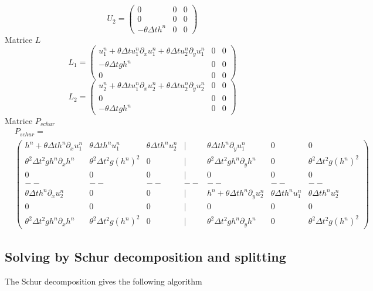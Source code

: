 \documentclass[a4paper, 11pt]{report}
\begin{document}
\begin{equation*}
U_2=\begin{pmatrix}
0&0&0\\
0&0&0\\
-\theta\Delta th^n&0&0
\end{pmatrix}
\end{equation*}
Matrice $L$
\begin{equation*}
L_1=\begin{pmatrix}
u_1^n+\theta\Delta tu_1^n\partial_xu_1^n+\theta\Delta tu_2^n\partial_yu_1^n&0&0\\
-\theta \Delta tgh^n&0&0\\
0&0&0
\end{pmatrix}
\end{equation*}
\begin{equation*}
L_2=\begin{pmatrix}
u_2^n+\theta\Delta tu_1^n\partial_xu_2^n+\theta\Delta tu_2^n\partial_yu_2^n&0&0\\
0&0&0\\
-\theta\Delta tgh^n&0&0
\end{pmatrix}
\end{equation*}
Matrice $P_{schur}$
\begin{equation*}
\begin{split}
&P_{schur}=\\
&\begin{pmatrix}
h^n+\theta\Delta th^n\partial_xu_1^n&\theta\Delta th^nu_1^n&\theta\Delta th^nu_2^n&|&\theta\Delta th^n\partial_yu_1^n&0&0\\
\theta^2\Delta t^2gh^n\partial_x h^n&\theta^2\Delta t^2g(h^n)^2&0&|&\theta^2\Delta t^2gh^n\partial_yh^n&0&\theta^2\Delta t^2g(h^n)^2\\
0&0&0&|&0&0&0\\
--&--&--&--&--&--&--\\
\theta \Delta th^n\partial_xu_2^n&0&0&|&h^n+\theta\Delta th^n\partial_yu_2^n&\theta\Delta th^nu_1^n&\theta\Delta th^nu_2^n\\
0&0&0&|&0&0&0\\
\theta^2\Delta t^2gh^n\partial_xh^n&\theta^2\Delta t^2g(h^n)^2&0&|&\theta^2\Delta t^2gh^n\partial_yh^n&0&\theta^2\Delta t^2g(h^n)^2
\end{pmatrix}
\end{split}
\end{equation*}


\subsection{Solving  by Schur decomposition and splitting}
The Schur decomposition gives the following algorithm
\end{document}
